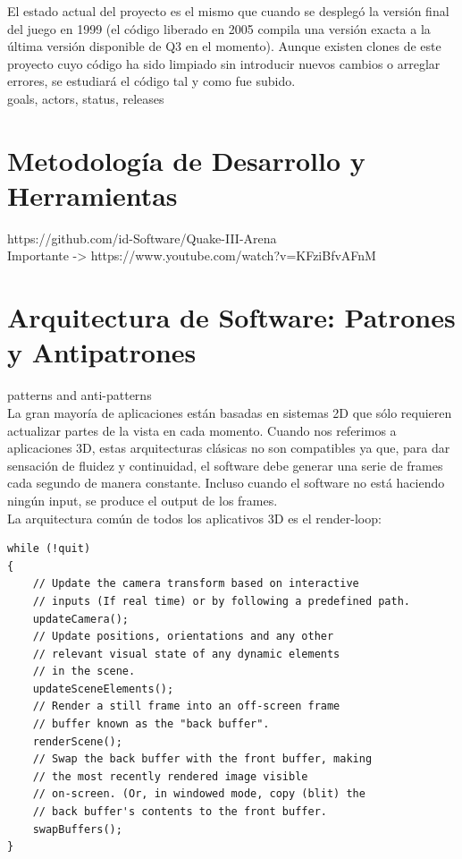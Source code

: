 \documentclass[a4paper,12pt]{report}
\begin{document}
	El estado actual del proyecto es el mismo que cuando se desplegó la versión final del juego en 1999 (el código liberado en 2005 compila una versión exacta a la última versión disponible de Q3 en el momento). Aunque existen clones de este proyecto cuyo código ha sido limpiado sin introducir nuevos cambios o arreglar errores, se estudiará el código tal y como fue subido.\\
	
	goals, actors, status, releases \cite{example}\\
	
	\section{Metodología de Desarrollo y Herramientas}
	https://github.com/id-Software/Quake-III-Arena\\
	Importante -> https://www.youtube.com/watch?v=KFziBfvAFnM\\
	
	\section{Arquitectura de Software: Patrones y Antipatrones}
	patterns and anti-patterns\\
	La gran mayoría de aplicaciones están basadas en sistemas 2D que sólo requieren actualizar partes de la vista en cada momento. Cuando nos referimos a aplicaciones 3D, estas arquitecturas clásicas no son compatibles ya que, para dar sensación de fluidez y continuidad, el software debe generar una serie de frames cada segundo de manera constante. Incluso cuando el software no está haciendo ningún input, se produce el output de los frames. \\
	
	La arquitectura común de todos los aplicativos 3D es el render-loop:
	
	\begin{lstlisting}[style=C, numbers=none]
while (!quit)
{
	// Update the camera transform based on interactive
	// inputs (If real time) or by following a predefined path.
	updateCamera();
	// Update positions, orientations and any other
	// relevant visual state of any dynamic elements
	// in the scene.
	updateSceneElements();
	// Render a still frame into an off-screen frame
	// buffer known as the "back buffer".
	renderScene();
	// Swap the back buffer with the front buffer, making
	// the most recently rendered image visible
	// on-screen. (Or, in windowed mode, copy (blit) the
	// back buffer's contents to the front buffer.
	swapBuffers();
}
\end{lstlisting}
	
\end{document}
